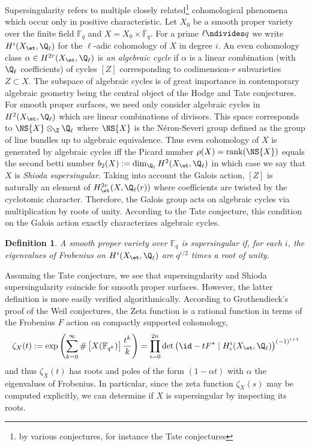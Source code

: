 \documentclass[12pt]{amsart}
\newtheorem*{defnn}{Definition}
\begin{document}
Supersingularity refers to multiple closely related\footnote{by various conjectures, for instance the Tate conjectures} cohomological phenomena which occur only in positive characteristic. Let $X_0$ be a smooth proper variety over the finite field $\mathbb{F}_q$ and $X = X_0 \times \overline{\mathbb{F}}_q$. For a prime $\ell \ndivides q$ we write $H^{i}(X_{\et}, \Q_\ell)$ for the $\ell$-adic \etale cohomology of $X$ in degree $i$. An even cohomology class $\alpha \in H^{2r}(X_{\et}, \Q_\ell)$ is \textit{an algebraic cycle} if $\alpha$ is a linear combination (with $\Q_\ell$ coefficients) of cycles $[Z]$ corresponding to codimension-$r$ subvarieties $Z \subset X$. The subspace of algebraic cycles is of great importance in contemporary algebraic geometry being the central object of the Hodge and Tate conjectures. For smooth proper surfaces, we need only consider algebraic cycles in $H^2(X_{\et}, \Q_\ell)$ which are linear combinations of divisors. This space corresponds to $\NS{X} \otimes_\Z \Q_\ell$ where $\NS{X}$ is the N\'{e}ron-Severi group defined as the group of line bundles up to algebraic equivalence. Thus even cohomology of $X$ is generated by algebraic cycles iff the Picard number $\rho(X) = \mathrm{rank}(\NS{X})$ equals the second betti number $b_2(X) := \dim_{\Q_\ell} H^2(X_{\et}, \Q_\ell)$ in which case we say that $X$ is \textit{Shioda supersingular}.
Taking into account the Galois action, $[Z]$ is naturally an element of $H^{2r}_{\et}(X, \Q_\ell(r))$ where coefficients are twisted by the cyclotomic character. Therefore, the Galois group acts on algebraic cycles via multiplication by roots of unity. According to the Tate conjecture, this condition on the Galois action exactly characterizes algebraic cycles.
\begin{defnn}
A smooth proper variety over $\mathbb{F}_q$ is \textit{supersingular} if, for each $i$, the eigenvalues of Frobenius on $H^{i}(X_{\et}, \Q_\ell)$ are $q^{i/2}$ times a root of unity.
\end{defnn}
\noindent
Assuming the Tate conjecture, we see that supersingularity and Shioda supersingularity coincide for smooth proper surfaces.
However, the latter definition is more easily verified algorithmically. According to Grothendieck's proof of the Weil conjectures, the Zeta function is a rational function in terms of the Frobenius $F$ action on compactly supported \etale cohomology,
\[ \zeta_X(t) := \exp{ \left( \sum_{k = 0}^\infty \# \left[ X(\mathbb{F}_{q^k}) \right] \frac{t^k}{k} \right)} = \prod_{i = 0}^{2n} \det{\left( \id - t F^* \mid H^{i}_c(X_{\et}, \Q_\ell) \right)}^{(-1)^{i + 1}} \]
and thus $\zeta_X(t)$ has roots and poles of the form $(1 - \alpha t)$ with $\alpha$ the eigenvalues of Frobenius. In particular, since the zeta function $\zeta_X(s)$ may be computed explicitly, we can determine if $X$ is supersingular by inspecting its roots.
\end{document}
